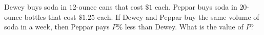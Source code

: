 Dewey buys soda in $12$-ounce cans that cost $\$1$ each. Peppar buys soda in $20$-ounce bottles that cost $\$1.25$ each. If Dewey and Peppar buy the same volume of soda in a week, then Peppar pays $P\%$ less than Dewey. What is the value of $P$?
